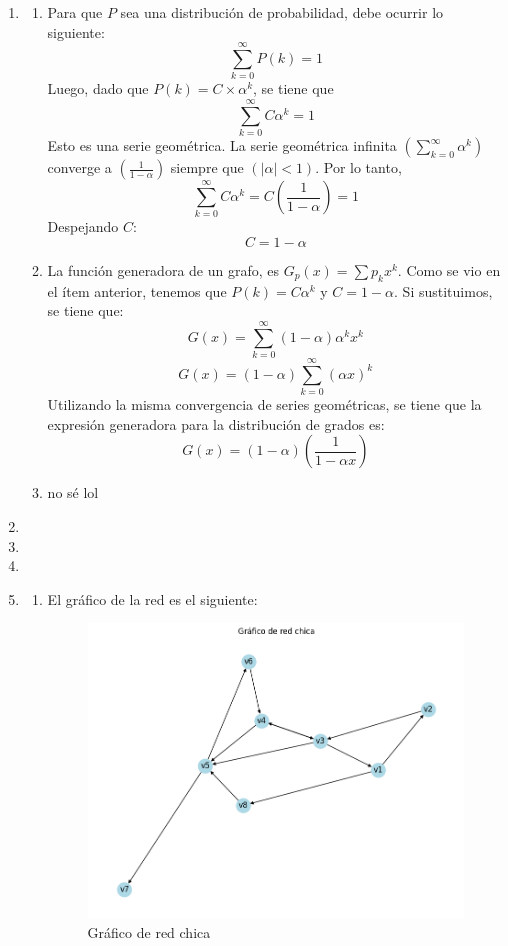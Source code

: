 \documentclass[12pt]{article}
\begin{document}
\begin{enumerate}
    \item 
    \begin{enumerate}
        \item Para que $P$ sea una distribución de probabilidad, debe ocurrir lo siguiente:
        $$\sum_{k=0}^{\infty}  P(k) = 1 $$
        Luego, dado que $P(k) = C \times \alpha ^k$, se tiene que 
        $$\sum_{k=0}^{\infty} C \alpha ^k= 1 $$
        Esto es una serie geométrica. La serie geométrica infinita $( \sum_{k=0}^{\infty} \alpha^k )$ converge a $( \frac{1}{1-\alpha} )$ siempre que $( |\alpha| < 1 )$. Por lo tanto,
        $$ \sum_{k=0}^{\infty} C \alpha ^k= C \left(\frac{1}{1-\alpha}\right) = 1 $$
        Despejando $C$:
        $$C = 1-\alpha$$

        \item La función generadora de un grafo, es $G_p(x) = \sum p_k x^k$. Como se vio en el ítem anterior, tenemos que $P(k) = C\alpha^k$ y $C = 1-\alpha$. Si sustituimos, se tiene que: 
        $$G(x) = \sum_{k=0}^{\infty}(1-\alpha)\alpha^k x^k$$ 
        $$G(x) = (1-\alpha)\sum_{k=0}^{\infty}(\alpha x)^k$$ 
        Utilizando la misma convergencia de series geométricas, se tiene que la expresión generadora para la distribución de grados es:
        $$G(x) = (1-\alpha)\left(\frac{1}{1-\alpha x}\right)$$

        \item no sé lol
    \end{enumerate}

    \item 
    
    \item 
    
    \item 
    
    \item
    \begin{enumerate}
        \item El gráfico de la red es el siguiente:
        \begin{figure}[H]
            \centering
            \includegraphics[scale=0.5]{images/grafico_red_chica.png}
            \caption{Gráfico de red chica}
            \label{fig:graph_red_chica}
        \end{figure}


\end{enumerate}
\end{enumerate}
\end{document}
